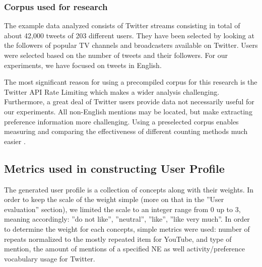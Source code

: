 \subsubsection{Corpus used for research}

The example data analyzed consists of Twitter streams consisting in total of about 42,000 tweets of
203 different users. They have been selected by looking at the followers of popular TV
channels and broadcasters available on Twitter. Users were selected based on the number
of tweets and their followers. For our experiments, we have focused on tweets in English.

The most significant reason for using a precompiled corpus for this research is the Twitter API Rate Limiting
which makes a wider analysis challenging. Furthermore, a great deal of Twitter users provide data not necessarily
useful for our experiments. All non-English mentions may be located,
but make extracting preference information more challenging. Using a preselected corpus enables measuring and comparing the effectiveness of different counting methods much easier \cite{short-tweet}.

\subsection{Metrics used in constructing User Profile}

The generated user profile is a collection of concepts along with their
weights. In order to keep the scale of the weight simple (more on that in the
''User evaluation'' section), we limited the scale to an integer range from 0
up to 3, meaning accordingly: ''do not like'', ''neutral'', ''like'', ''like
very much''. In order to determine the weight for each concepts, simple metrics
were used: number of repeats normalized to the mostly repeated item for
YouTube, and type of mention, the amount of mentions of a specified NE as well
activity/preference vocabulary usage for Twitter.

